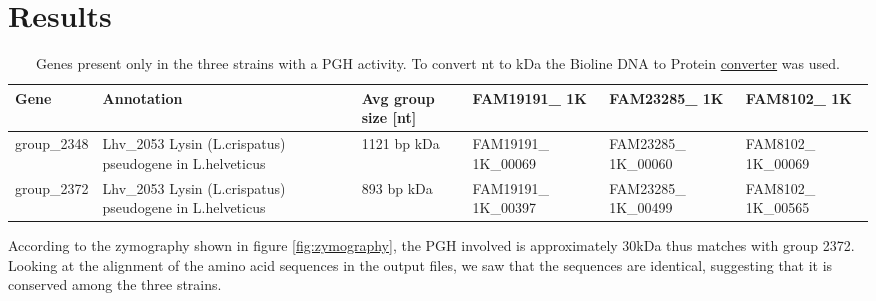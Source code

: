 \documentclass[10pt,a4paper]{article}
\begin{document}
\section*{\large Results}


\begin{table}[htbp]
	\centering
	\begin{tabularx}{\linewidth}{|X|X|X|X|X|X|}
		\hline
		\textbf{Gene} & \textbf{Annotation} & \textbf{Avg group size [nt]} & \textbf{FAM19191\_ 1K} & \textbf{FAM23285\_ 1K} & \textbf{FAM8102\_ 1K}\\
		 \hline
		group\_2348 & Lhv\_2053 Lysin (L.crispatus) pseudogene in L.helveticus & 1121 bp  \newline     41 kDa & FAM19191\_ 1K\_00069 & FAM23285\_ 1K\_00060 & FAM8102\_ 1K\_00069 \\
		\hline
		group\_2372 & Lhv\_2053 Lysin (L.crispatus) pseudogene in L.helveticus & 893 bp    \newline    33 kDa & FAM19191\_ 1K\_00397 & FAM23285\_ 1K\_00499 & FAM8102\_ 1K\_00565 \\
		\hline	
	\end{tabularx}
	\caption{Genes present only in the three strains with a PGH activity. To convert nt to kDa the Bioline DNA to Protein \href{https://www.bioline.com/us/media/calculator/01_06.html}{converter} was used.}
	\label{tab:resultPGHexpr}
\end{table}

\noindent According to the zymography shown in figure \ref{fig:zymography}, the PGH involved is approximately 30kDa thus matches with group 2372. Looking at the alignment of the amino acid sequences in the output files,
we saw that the sequences are identical, suggesting that it is conserved among the three strains. \\







\end{document}
